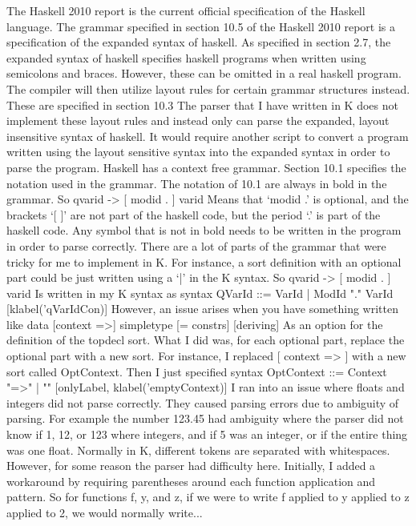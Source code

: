 The Haskell 2010 report is the current official specification of the Haskell language. %
The grammar specified in section 10.5 of the Haskell 2010 report is a specification of the expanded syntax of haskell.
As specified in section 2.7, the expanded syntax of haskell specifies haskell programs when written using semicolons and braces. However, these can be omitted in a real haskell program. The compiler will then utilize layout rules for certain grammar structures instead. These are specified in section 10.3
The parser that I have written in K does not implement these layout rules and instead only can parse the expanded, layout insensitive syntax of haskell. It would require another script to convert a program written using the layout sensitive syntax into the expanded syntax in order to parse the program.
Haskell has a context free grammar.
	Section 10.1 specifies the notation used in the grammar.
The notation of 10.1 are always in bold in the grammar. So
qvarid -> [ modid . ] varid
Means that ‘modid .’ is optional, and the brackets ‘[ ]’ are not part of the haskell code, but the period ‘.’ is part of the haskell code. Any symbol that is not in bold needs to be written in the program in order to parse correctly.
There are a lot of parts of the grammar that were tricky for me to implement in K. For instance, a sort definition with an optional part could be just written using a ‘|’ in the K syntax. So 
qvarid -> [ modid . ] varid
Is written in my K syntax as
syntax QVarId ::= VarId | ModId "." VarId [klabel('qVarIdCon)]
However, an issue arises when you have something written like
data [context =>] simpletype [= constrs] [deriving]
As an option for the definition of the topdecl sort. What I did was, for each optional part, replace the optional part with a new sort. For instance, I replaced [ context => ] with a new sort called OptContext. Then I just specified
syntax OptContext ::= Context "=>" | "" [onlyLabel, klabel('emptyContext)]
I ran into an issue where floats and integers did not parse correctly. They caused parsing errors due to ambiguity of parsing. For example the number 123.45 had ambiguity where the parser did not know if 1, 12, or 123 where integers, and if 5 was an integer, or if the entire thing was one float. Normally in K, different tokens are separated with whitespaces. However, for some reason the parser had difficulty here. Initially, I added a workaround by requiring parentheses around each function application and pattern. So for functions f, y, and z, if we were to write f applied to y applied to z applied to 2, we would normally write...
